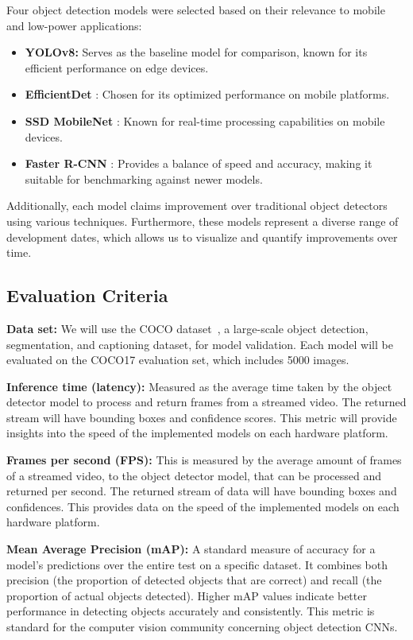 \documentclass[10pt,twocolumn,letterpaper]{article}
\begin{document}
Four object detection models were selected based on their relevance to mobile and low-power applications:
\begin{itemize}
    \item \textbf{YOLOv8:} Serves as the baseline model for comparison, known for its efficient performance on edge devices.
    \item \textbf{EfficientDet} \cite{tan2020efficientdet}: Chosen for its optimized performance on mobile platforms.
    \item \textbf{SSD MobileNet} \cite{Liu_2016}: Known for real-time processing capabilities on mobile devices.
    \item \textbf{Faster R-CNN} \cite{ren2016faster}: Provides a balance of speed and accuracy, making it suitable for benchmarking against newer models.
\end{itemize}

Additionally, each model claims improvement over traditional object detectors using various techniques. Furthermore, these models represent a diverse range of development dates, which allows us to visualize and quantify improvements over time.

\subsection{Evaluation Criteria}
\label{subsec:EvaluationCriteria}

\textbf{Data set:} We will use the COCO dataset~\cite{lin2015microsoft}, a large-scale object detection, segmentation, and captioning dataset, for model validation.
Each model will be evaluated on the COCO17 evaluation set, which includes 5000 images.

\textbf{Inference time (latency):} Measured as the average time taken by the object detector model to process and return frames from a streamed video.
The returned stream will have bounding boxes and confidence scores.
This metric will provide insights into the speed of the implemented models on each hardware platform.

\textbf{Frames per second (FPS):} This is measured by the average amount of frames of a streamed video, to the object detector model, that can be processed and returned per second.
The returned stream of data will have bounding boxes and confidences.
This provides data on the speed of the implemented models on each hardware platform.

\textbf{Mean Average Precision (mAP):} A standard measure of accuracy for a model's predictions over the entire test on a specific dataset.
It combines both precision (the proportion of detected objects that are correct) and recall (the proportion of actual objects detected).
Higher mAP values indicate better performance in detecting objects accurately and consistently.
This metric is standard for the computer vision community concerning object detection CNNs.
\end{document}
